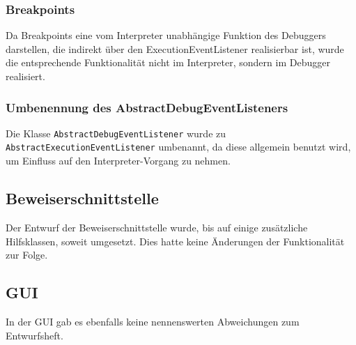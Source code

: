 \subsubsection{Breakpoints}
Da Breakpoints eine vom Interpreter unabhängige Funktion des Debuggers darstellen, die indirekt über den ExecutionEventListener realisierbar ist, wurde die entsprechende Funktionalität nicht im Interpreter, sondern im Debugger realisiert.

\subsubsection{Umbenennung des AbstractDebugEventListeners}
Die Klasse \texttt{AbstractDebugEventListener} wurde zu \texttt{AbstractExecutionEventListener} umbenannt, da diese allgemein benutzt wird, um Einfluss auf den Interpreter-Vorgang zu nehmen.

\subsection{Beweiserschnittstelle}
Der Entwurf der Beweiserschnittstelle wurde, bis auf einige zusätzliche Hilfsklassen, soweit umgesetzt. Dies hatte keine Änderungen der Funktionalität zur Folge.

\subsection{GUI}
In der GUI gab es ebenfalls keine nennenswerten Abweichungen zum Entwurfsheft.
